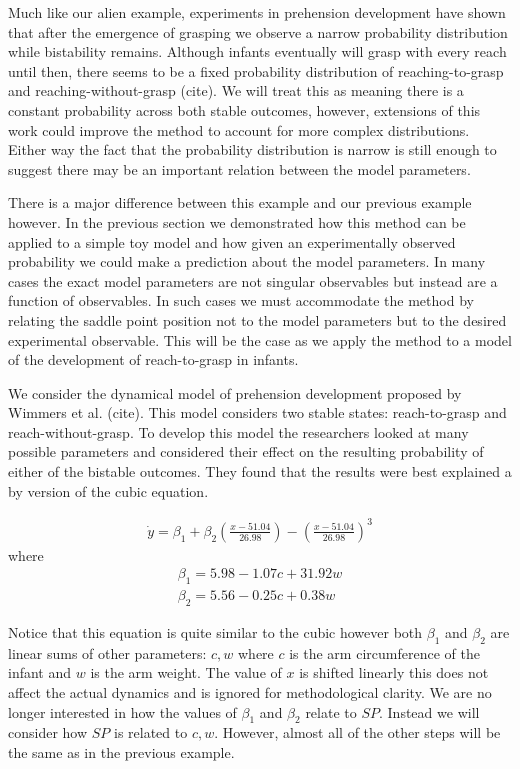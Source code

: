 \documentclass[letterpaper]{article}
\begin{document}
Much like our alien example, experiments in prehension development 
have shown that after
the emergence of grasping we observe a narrow probability distribution 
while bistability
remains. Although infants eventually will grasp with every reach until 
then, there seems to
be a fixed probability distribution of reaching-to-grasp and 
reaching-without-grasp (cite).
We will treat this as meaning there is a constant probability across 
both stable outcomes,
however, extensions of this work could improve the method to account for
more complex distributions.
Either way the fact that the probability distribution is narrow is still 
enough to suggest
there may be an important relation between the model parameters.

There is a major difference between this example and our previous example however. 
In the previous  section we demonstrated how this method can be applied to a simple
toy model and how given an experimentally observed probability we could make a prediction
about the model parameters. In many cases the exact model parameters are 
not singular observables but instead are a function of observables. In such cases we 
must accommodate the method by relating the saddle point position not to the model
parameters but to the desired experimental observable. 
This will be the case as we apply the method to a model of the development of 
reach-to-grasp in infants. 

We consider the dynamical model of prehension development proposed by 
Wimmers et al. (cite). This
model considers two stable states: reach-to-grasp and reach-without-grasp. 
To develop this
model the researchers looked at many possible parameters and considered 
their effect on 
the resulting probability of either of the bistable outcomes. 
They found that the results
were best explained a by version of the cubic equation.

\begin{eqnarray}
  \dot{y} = \beta_1 + \beta_2 (\frac{x-51.04}{26.98}) - (\frac{x-51.04}{26.98})^3
\end{eqnarray}
where
\begin{eqnarray}
  \beta_1 = 5.98 - 1.07c + 31.92w\\
  \beta_2 = 5.56 - 0.25c + 0.38w
\end{eqnarray}

Notice that this equation is quite similar to the cubic however both $\beta_1$ and 
$\beta_2$ are linear sums of other parameters: $c,w$ 
where $c$ is the arm circumference
of the infant and $w$ is the arm weight. 
The value of $x$ is shifted linearly this does 
not affect the actual dynamics and is ignored for methodological clarity. 
We are no longer
interested in how the values of $\beta_1$ and $\beta_2$ relate to $SP$. 
Instead we will
consider how $SP$ is related to $c,w$. 
However, almost all of the other steps will be the
same as in the previous example.
\end{document}
